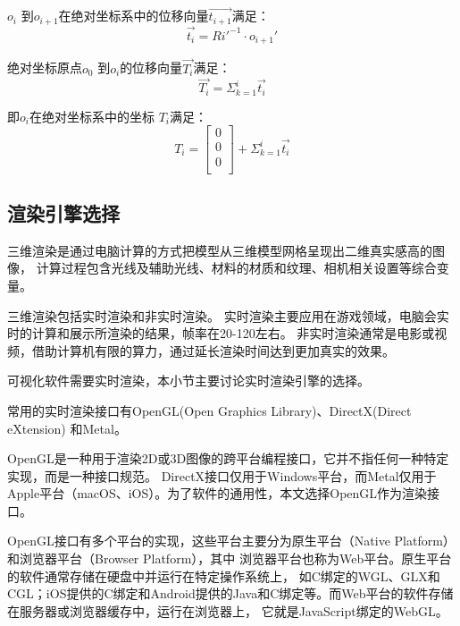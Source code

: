 $o_i$ 到$o_{i+1}$在绝对坐标系中的位移向量$\vec{t_{i+1}}$满足：
    \begin{equation}
    \vec{t_i} = Ri'^{-1}\cdot o_{i+1}'
    \end{equation}

绝对坐标原点$o_0$ 到$o_i$的位移向量$\vec{T_i}$满足：
    \begin{equation}
    \vec{T_i} = \Sigma_{k=1} ^ {i} \vec{t_i}
    \end{equation}

即$o_i$在绝对坐标系中的坐标 $T_i$满足\cite{用于光纤光栅曲线重建算法的坐标点拟合}：
\begin{equation}
T_i = \left[
    \begin{matrix}
    0\\
    0\\
    0\\
  	\end{matrix}
  \right]
  + \Sigma_{k=1} ^ {i} \vec{t_i}
\end{equation}
\FloatBarrier

\subsection{渲染引擎选择}
\label{sec:render}

三维渲染是通过电脑计算的方式把模型从三维模型网格呈现出二维真实感高的图像\cite{3DModels_SurveyPaper}，
计算过程包含光线及辅助光线、材料的材质和纹理、相机相关设置等综合变量\cite{scientce-of-3d-rendering}。

三维渲染包括实时渲染和非实时渲染。
实时渲染主要应用在游戏领域，电脑会实时的计算和展示所渲染的结果，帧率在20-120左右。
非实时渲染通常是电影或视频，借助计算机有限的算力，通过延长渲染时间达到更加真实的效果。

可视化软件需要实时渲染，本小节主要讨论实时渲染引擎的选择。

常用的实时渲染接口有OpenGL(Open Graphics Library)\cite{opengl}、DirectX(Direct eXtension)\cite{directx}
和Metal\cite{metal}。

OpenGL是一种用于渲染2D或3D图像的跨平台编程接口\cite{opengl}，它并不指任何一种特定实现，而是一种接口规范。
DirectX接口仅用于Windows平台，而Metal仅用于Apple平台（macOS、iOS）。为了软件的通用性，本文选择OpenGL作为渲染接口。

OpenGL接口有多个平台的实现，这些平台主要分为原生平台（Native Platform）和浏览器平台（Browser Platform），其中
浏览器平台也称为Web平台。原生平台的软件通常存储在硬盘中并运行在特定操作系统上，
如C绑定的WGL、GLX和CGL；iOS提供的C绑定和Android提供的Java和C绑定等。而Web平台的软件存储在服务器或浏览器缓存中，运行在浏览器上，
它就是JavaScript绑定的WebGL。

